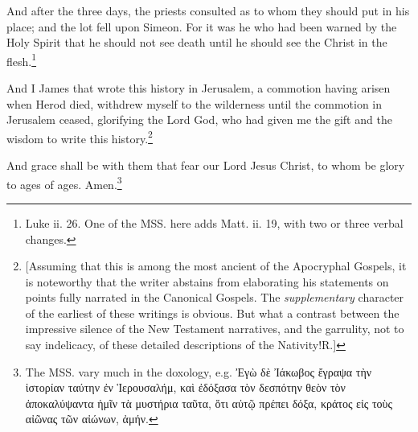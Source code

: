 \pend\pstart
And after the three days, the priests consulted as to whom they should put in his place; and the lot fell upon Simeon. For it was he who had been warned by the Holy Spirit that he should not see death until he should see the Christ in the flesh.\footnote{Luke ii. 26. One of the MSS. here adds Matt. ii. 19, with two or three verbal changes.}

\pend\pstart
{}

\pend\setcounter{pstartR}{1}\pstart
And I James that wrote this history in Jerusalem, a commotion having arisen when Herod died, withdrew myself to the wilderness until the commotion in Jerusalem ceased, glorifying the Lord God, who had given me the gift and the wisdom to write this history.\footnote{[Assuming that this is among the most ancient of the Apocryphal Gospels, it is noteworthy that the writer abstains from elaborating his statements on points fully narrated in the Canonical Gospels. The \textit{supplementary} character of the earliest of these writings is obvious. But what a contrast between the impressive silence of the New Testament narratives, and the garrulity, not to say indelicacy, of these detailed descriptions of the Nativity!\textemdash R.]}

\pend\pstart
And grace shall be with them that fear our Lord Jesus Christ, to whom be glory to ages of ages. Amen.\footnote{The MSS. vary much in the doxology, e.g. {\greekfont Ἐγὼ δὲ Ἰάκωβος ἔγραψα τὴν ἱστορίαν ταύτην ἐν Ἱερουσαλήμ, καὶ ἐδόξασα τὸν δεσπότην θεὸν τὸν ἀποκαλύψαντα ἡμῖν τὰ μυστήρια ταῦτα, ὅτι αὐτῷ πρέπει δόξα, κράτος εἰς τοὺς αἰῶνας τῶν αἰώνων, ἀμήν.}}

\pend
